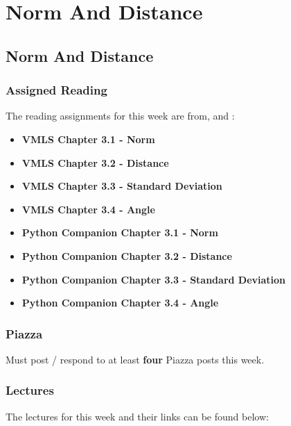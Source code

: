\clearpage

\renewcommand{\ChapTitle}{Norm And Distance}
\renewcommand{\SectionTitle}{Norm And Distance}

\chapter{\ChapTitle}
\section{\SectionTitle}

\subsection{Assigned Reading}

The reading assignments for this week are from, \VMLS \hspace*{1pt} and \PyCap:

\begin{itemize}
    \item \textbf{VMLS Chapter 3.1 - Norm}
    \item \textbf{VMLS Chapter 3.2 - Distance}
    \item \textbf{VMLS Chapter 3.3 - Standard Deviation}
    \item \textbf{VMLS Chapter 3.4 - Angle}
    \item \textbf{Python Companion Chapter 3.1 - Norm}
    \item \textbf{Python Companion Chapter 3.2 - Distance}
    \item \textbf{Python Companion Chapter 3.3 - Standard Deviation}
    \item \textbf{Python Companion Chapter 3.4 - Angle}
\end{itemize}

\subsection{Piazza}

Must post / respond to at least \textbf{four} Piazza posts this week.

\subsection{Lectures}

The lectures for this week and their links can be found below:

